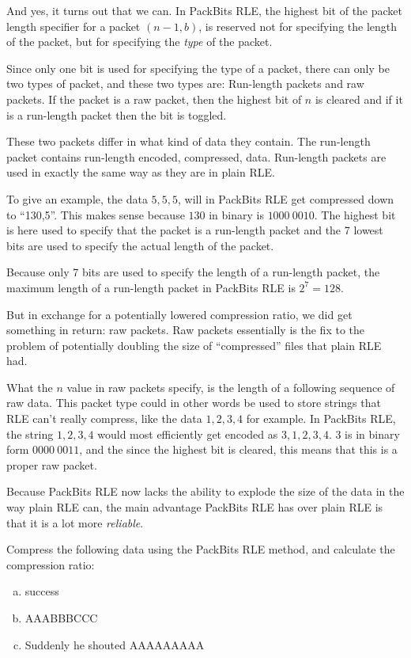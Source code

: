 And yes, it turns out that we can. In PackBits RLE, the highest bit of
the packet length specifier for a packet $(n-1,b)$, is reserved not
for specifying the length of the packet, but for specifying the
\textit{type} of the packet.

Since only one bit is used for specifying the type of a packet, there
can only be two types of packet, and these two types are: Run-length
packets and raw packets. If the packet is a raw packet, then the
highest bit of $n$ is cleared and if it is a run-length packet then
the bit is toggled.

These two packets differ in what kind of data they contain. The
run-length packet contains run-length encoded, compressed,
data. Run-length packets are used in exactly the same way as they are
in plain RLE.

To give an example, the data $5,5,5$, will in PackBits RLE get
compressed down to ``130,5''. This makes sense because $130$ in binary
is $1000\ 0010$. The highest bit is here used to specify that the
packet is a run-length packet and the 7 lowest bits are used to
specify the actual length of the packet.

Because only 7 bits are used to specify the length of a run-length
packet, the maximum length of a run-length packet in PackBits RLE is
$2^7 = 128$.

But in exchange for a potentially lowered compression ratio, we did
get something in return: raw packets. Raw packets essentially is the
fix to the problem of potentially doubling the size of ``compressed''
files that plain RLE had.

What the $n$ value in raw packets specify, is the length of a
following sequence of raw data. This packet type could in other words
be used to store strings that RLE can't really compress, like the data
$1,2,3,4$ for example. In PackBits RLE, the string $1,2,3,4$ would
most efficiently get encoded as $3,1,2,3,4$. $3$ is in binary form
$0000\ 0011$, and the since the highest bit is cleared, this means
that this is a proper raw packet.

Because PackBits RLE now lacks the ability to explode the size of the
data in the way plain RLE can, the main advantage PackBits RLE has
over plain RLE is that it is a lot more \textit{reliable}.

\begin{Exercise}[label={packbits-rle}]

  Compress the following data using the PackBits RLE method, and
  calculate the compression ratio:

  \begin{enumerate}[(a)]
  \item success
  \item AAABBBCCC
  \item Suddenly he shouted AAAAAAAAA
  \end{enumerate}

\end{Exercise}

